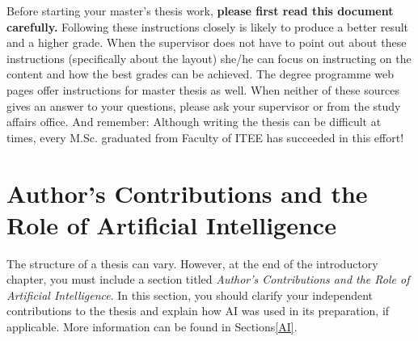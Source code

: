 Before starting your master’s thesis work, \textbf{please first read this document carefully.} Following these instructions closely is likely to produce a better result and a higher grade. When the supervisor does not have to point out about these instructions (specifically about the layout) she/he can focus on instructing on the content and how the best grades can be achieved. The degree programme web pages \cite{mscstudies} offer instructions for master thesis as well. When neither of these sources gives an answer to your questions, please ask your supervisor or from the study affairs office. And remember: Although writing the thesis can be difficult at times, every M.Sc. graduated from Faculty of ITEE has succeeded in this effort!

\section{Author's Contributions and the Role of Artificial Intelligence}

The structure of a thesis can vary. However, at the end of the introductory chapter, you must include a section titled \textit{Author's Contributions and the Role of Artificial Intelligence}. In this section, you should clarify your independent contributions to the thesis and explain how AI was used in its preparation, if applicable. More information can be found in Sections\DIFdelbegin {}\DIFdelend \DIFaddbegin {}\DIFaddend \ref{AI}.
